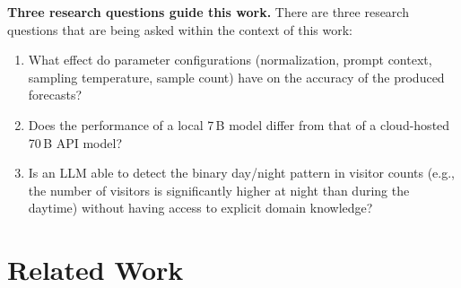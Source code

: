 \documentclass[11pt,a4paper]{article}
\begin{document}
\textbf{Three research questions guide this work.} 
There are three research questions that are being asked within the context of this work:
\begin{enumerate}[leftmargin=*]
\item What effect do parameter configurations (normalization, prompt context, sampling temperature, sample count) have on the accuracy of the produced forecasts? 
\item Does the performance of a local 7\,B model differ from that of a cloud-hosted 70\,B API model? 
\item Is an LLM able to detect the binary day/night pattern in visitor counts (e.g., the number of visitors is significantly higher at night than during the daytime) without having access to explicit domain knowledge?
\end{enumerate}


\section{Related Work}
\end{document}
